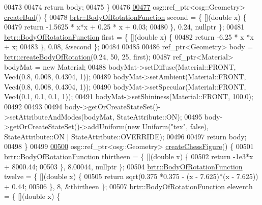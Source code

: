 \begin{DoxyCode}
00473 
00474         \textcolor{keywordflow}{return} body;
00475     \}
00476 
\hypertarget{_util_functions_8cpp_source_l00477}{}\hyperlink{namespacebrtr_a51b3741c30ca1b6282b9693055ddc060}{00477}     osg::ref\_ptr<osg::Geometry> \hyperlink{namespacebrtr_a51b3741c30ca1b6282b9693055ddc060}{createBud}() \{
00478         \hyperlink{structbrtr_1_1_body_of_rotation_function}{brtr::BodyOfRotationFunction} second = \{ [](\textcolor{keywordtype}{double} x) \{
00479             \textcolor{keywordflow}{return}  -1.5625 * x*x + 0.25 * x + 0.03;
00480         \}, 0.24, \textcolor{keyword}{nullptr} \};
00481         \hyperlink{structbrtr_1_1_body_of_rotation_function}{brtr::BodyOfRotationFunction} first = \{ [](\textcolor{keywordtype}{double} x) \{
00482             \textcolor{keywordflow}{return} -6.25 * x *x + x;
00483         \}, 0.08, &second \};
00484 
00485 
00486         ref\_ptr<Geometry> body = \hyperlink{namespacebrtr_a83d3e627c9dc247459610aa9fec23d7b}{brtr::createBodyOfRotation}(0.24, 50, 25, first);
00487         ref\_ptr<Material> bodyMat = \textcolor{keyword}{new} Material;
00488         bodyMat->setDiffuse(Material::FRONT, Vec4(0.8, 0.008, 0.4304, 1));
00489         bodyMat->setAmbient(Material::FRONT, Vec4(0.8, 0.008, 0.4304, 1)); 
00490         bodyMat->setSpecular(Material::FRONT, Vec4(0.1, 0.1, 0.1, 1));
00491         bodyMat->setShininess(Material::FRONT, 100.0);
00492 
00493 
00494         body->getOrCreateStateSet()->setAttributeAndModes(bodyMat, StateAttribute::ON);
00495         body->getOrCreateStateSet()->addUniform(\textcolor{keyword}{new} Uniform(\textcolor{stringliteral}{"tex"}, \textcolor{keyword}{false}), StateAttribute::ON | 
      StateAttribute::OVERRIDE);
00496 
00497         \textcolor{keywordflow}{return} body;
00498     \}
00499 
\hypertarget{_util_functions_8cpp_source_l00500}{}\hyperlink{namespacebrtr_a118d4013732dea1a161b6d225df6dc2e}{00500}     osg::ref\_ptr<osg::Geometry> \hyperlink{namespacebrtr_a118d4013732dea1a161b6d225df6dc2e}{createChessFigure}() \{
00501         \hyperlink{structbrtr_1_1_body_of_rotation_function}{brtr::BodyOfRotationFunction} thirtheen = \{ [](\textcolor{keywordtype}{double} x) \{
00502             \textcolor{keywordflow}{return}  -1e3*x + 8000.44;
00503         \}, 8.00044, \textcolor{keyword}{nullptr} \};
00504         \hyperlink{structbrtr_1_1_body_of_rotation_function}{brtr::BodyOfRotationFunction} twelve = \{ [](\textcolor{keywordtype}{double} x) \{
00505             \textcolor{keywordflow}{return} sqrt(0.375 *0.375 - (x - 7.625)*(x - 7.625)) + 0.44;
00506         \}, 8, &thirtheen \};
00507         \hyperlink{structbrtr_1_1_body_of_rotation_function}{brtr::BodyOfRotationFunction} eleventh = \{ [](\textcolor{keywordtype}{double} x) \{

\end{DoxyCode}
